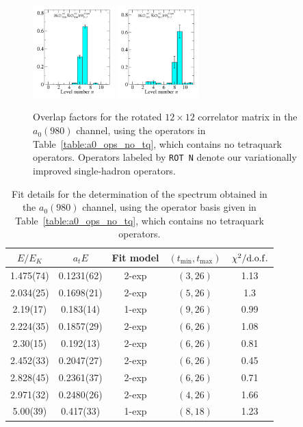 \begin{figure}
  \includegraphics[width=0.28\textwidth]{figures/spectrum_a1gm/no_tq/zfactors/zfactor_isotriplet_kaon_kbar-A1gm_1-P011-A2-SS_0-P0-1-1-A2-SS_0.pdf}
  \includegraphics[width=0.28\textwidth]{figures/spectrum_a1gm/no_tq/zfactors/zfactor_isotriplet_kaon_kbar-A1gm_1-P011-A2-SS_1-P0-1-1-A2-SS_1.pdf}
  \cprotect\caption{Overlap factors for the rotated $12\times 12$ correlator matrix in the $a_0(980)$ channel, using the operators in Table~\ref{table:a0_ops_no_tq}, which contains no tetraquark operators. Operators labeled by \verb+ROT N+ denote our variationally improved single-hadron operators.}
  \label{fig:a0_no_tq_zfactors}
\end{figure}

\begin{table}
  \centering
  \begin{tabular}{c|c|c|c|c}
    $E / E_K$ & $a_t E$ & Fit model & $(t_{\mathrm{min}}, {t_\mathrm{max}})$ & $\chi^2 / \rm{d.o.f.}$\\
    \hline
    1.475(74)&0.1231(62)&2{-}exp&$(3, 26)$&1.13\\
    2.034(25)&0.1698(21)&2{-}exp&$(5, 26)$&1.3\\
    2.19(17)&0.183(14)&1{-}exp&$(9, 26)$&0.99\\
    2.224(35)&0.1857(29)&2{-}exp&$(6, 26)$&1.08\\
    2.30(15)&0.192(13)&2{-}exp&$(6, 26)$&0.81\\
    2.452(33)&0.2047(27)&2{-}exp&$(6, 26)$&0.45\\
    2.828(45)&0.2361(37)&2{-}exp&$(6, 26)$&0.71\\
    2.971(32)&0.2480(26)&2{-}exp&$(4, 26)$&1.66\\
    5.00(39)&0.417(33)&1{-}exp&$(8, 18)$&1.23
  \end{tabular}
  \caption{Fit details for the determination of the spectrum obtained in the $a_0(980)$ channel, using the operator basis given in Table~\ref{table:a0_ops_no_tq}, which contains no tetraquark operators.}
  \label{table:a0_no_tq_spectrum}
\end{table}

